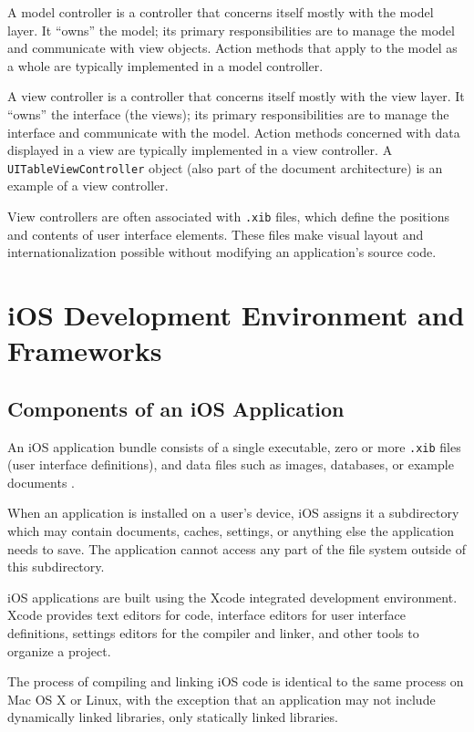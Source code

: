 A model controller is a controller that concerns itself mostly with the model
layer. It ``owns'' the model; its primary responsibilities are to manage the model
and communicate with view objects. Action methods that apply to the model as a
whole are typically implemented in a model controller.

A view controller is a controller that concerns itself mostly with the view
layer. It ``owns'' the interface (the views); its primary responsibilities are to
manage the interface and communicate with the model. Action methods concerned
with data displayed in a view are typically implemented in a view controller. A
\texttt{UITableViewController} object (also part of the document architecture)
is an example of a view controller.

View controllers are often associated with \texttt{.xib} files, which define the
positions and contents of user interface elements. These files make visual
layout and internationalization possible without modifying an application's
source code.

\section{iOS Development Environment and Frameworks}
\label{sect:ios_dev_env}

\subsection{Components of an iOS Application}

An iOS application bundle consists of a single executable, zero or more
\texttt{.xib} files (user interface definitions), and data files such as images,
databases, or example documents \cite{ios:application-programming-guide}.

When an application is installed on a user's device, iOS assigns it a
subdirectory which may contain documents, caches, settings, or anything else the
application needs to save. The application cannot access any part of the file
system outside of this subdirectory.

iOS applications are built using the Xcode integrated development environment.
Xcode provides text editors for code, interface editors for user interface
definitions, settings editors for the compiler and linker, and other tools to
organize a project.

The process of compiling and linking iOS code is identical to the same process
on Mac OS X or Linux, with the exception that an application may not include
dynamically linked libraries, only statically linked libraries.

